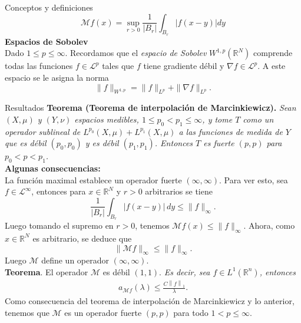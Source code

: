 \documentclass[final]{beamer}
\providecommand{\norm}[1]{\left\|#1\right\|}
\newlength{\colwidth}
\begin{document}
\begin{frame}[t]
\begin{columns}[t]
\begin{column}{\colwidth}
\begin{block}{Conceptos y definiciones}
			$$\mathcal{M}f(x)=\sup_{r>0}\frac{1}{|B_r|}\int_{B_r}|f(x-y)|dy$$
    \textbf{Espacios de Sobolev}\\
      Dado $1\leq p\leq \infty$. Recordamos que el \emph{espacio de Sobolev} $W^{1,p}(\mathbb{R}^N)$ comprende todas las funciones $f\in \mathcal{L}^p$ tales que $f$ tiene gradiente débil y $\nabla f\in \mathcal{L}^p$. A este espacio se le asigna la norma
          \begin{equation*}
              \|f\|_{W^{1,p}}=\|f\|_{L^p}+\|\nabla f\|_{L^p}.
          \end{equation*}
  \end{block}

  \begin{alertblock}{Resultados}
    \textbf{Teorema (Teorema de interpolación de Marcinkiewicz).} \emph{Sean $(X, \mu)$ y $(Y, \nu)$ espacios medibles, $1 \leq p_0<p_1 \leq \infty$, y tome $T$ como un operador sublineal de $L^{p_0}(X, \mu)+L^{p_1}(X, \mu)$ a las funciones de medida de $Y$ que es débil $\left(p_0, p_0\right)$ y es débil $\left(p_1, p_1\right)$. Entonces $T$ es fuerte $(p, p)$ para $p_0<p<p_1$.}\\
      \vspace{0.2cm}
      {\bf Algunas consecuencias:}\\
      La función maximal establece un operador fuerte $(\infty,\infty)$. Para ver esto, sea $f\in \mathcal{L}^{\infty}$, entonces para $x\in \mathbb{R}^N$ y $r>0$ arbitrarios se tiene
      \begin{equation*}
        \frac{1}{|B_r|}\int_{B_r} |f(x-y)|\, dy \leq \|f\|_{\infty}.
      \end{equation*}
      Luego tomando el supremo en $r>0$, tenemos $\mathcal{M}f(x)\leq \|f\|_{\infty}$. Ahora, como $x\in \mathbb{R}^N$ es arbitrario, se deduce que
      \begin{equation*}
        \|\mathcal{M}f\|_{\infty}\leq \|f\|_{\infty}.   
      \end{equation*}
      Luego $\mathcal{M}$ define un operador $(\infty,\infty)$.\\
      \vspace{0.2cm}
      {\bf Teorema}. {El operador $\mathcal{M}$ es débil $(1,1)$.} \emph{Es decir, sea $f\in L^{1}(\mathbb{R}^{n})$, entonces
      \begin{align*}
        a_{\mathcal{M}f}(\lambda)\leq \frac{C\norm{f}_{1}}{\lambda}.
      \end{align*}}
      \vspace{0.2cm}
      Como consecuencia del teorema de interpolación de Marcinkiewicz y lo anterior, tenemos que $\mathcal{M}$ es un operador fuerte $(p,p)$ para todo $1<p\leq \infty$.\\

\end{alertblock}
\end{column}
\end{columns}
\end{frame}
\end{document}

